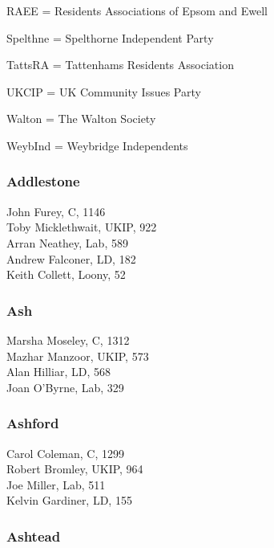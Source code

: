 \documentclass[a4paper,openany,10pt]{book}
\begin{document}
RAEE = Residents Associations of Epsom and Ewell

Spelthne = Spelthorne Independent Party

TattsRA = Tattenhams Residents Association

UKCIP = UK Community Issues Party

Walton = The Walton Society

WeybInd = Weybridge Independents



\subsubsection*{Addlestone}



John Furey, C, 1146\\
Toby Micklethwait, UKIP, 922\\
Arran Neathey, Lab, 589\\
Andrew Falconer, LD, 182\\
Keith Collett, Loony, 52\\


\subsubsection*{Ash}



Marsha Moseley, C, 1312\\
Mazhar Manzoor, UKIP, 573\\
Alan Hilliar, LD, 568\\
Joan O'Byrne, Lab, 329\\


\subsubsection*{Ashford}



Carol Coleman, C, 1299\\
Robert Bromley, UKIP, 964\\
Joe Miller, Lab, 511\\
Kelvin Gardiner, LD, 155\\


\subsubsection*{Ashtead}
\end{document}
